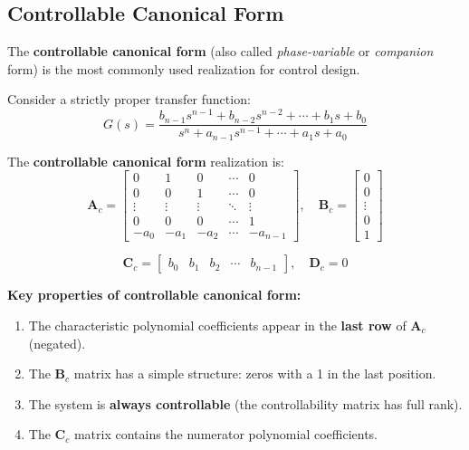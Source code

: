 \subsection{Controllable Canonical Form}

The \textbf{controllable canonical form} (also called \textit{phase-variable} or \textit{companion} form) is the most commonly used realization for control design.

Consider a strictly proper transfer function:
\begin{equation}
G(s) = \frac{b_{n-1}s^{n-1} + b_{n-2}s^{n-2} + \cdots + b_1s + b_0}{s^n + a_{n-1}s^{n-1} + \cdots + a_1s + a_0}
\label{eq:tf_general}
\end{equation}

The \textbf{controllable canonical form} realization is:
\begin{equation}
\mathbf{A}_c = \begin{bmatrix}
0 & 1 & 0 & \cdots & 0 \\
0 & 0 & 1 & \cdots & 0 \\
\vdots & \vdots & \vdots & \ddots & \vdots \\
0 & 0 & 0 & \cdots & 1 \\
-a_0 & -a_1 & -a_2 & \cdots & -a_{n-1}
\end{bmatrix}, \quad
\mathbf{B}_c = \begin{bmatrix} 0 \\ 0 \\ \vdots \\ 0 \\ 1 \end{bmatrix}
\label{eq:ccf_AB}
\end{equation}

\begin{equation}
\mathbf{C}_c = \begin{bmatrix} b_0 & b_1 & b_2 & \cdots & b_{n-1} \end{bmatrix}, \quad \mathbf{D}_c = 0
\label{eq:ccf_CD}
\end{equation}

\textbf{Key properties of controllable canonical form:}
\begin{enumerate}
    \item The characteristic polynomial coefficients appear in the \textbf{last row} of $\mathbf{A}_c$ (negated).
    \item The $\mathbf{B}_c$ matrix has a simple structure: zeros with a 1 in the last position.
    \item The system is \textbf{always controllable} (the controllability matrix has full rank).
    \item The $\mathbf{C}_c$ matrix contains the numerator polynomial coefficients.
\end{enumerate}


